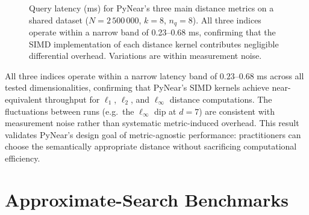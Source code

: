 \documentclass[11pt,a4paper]{article}
\begin{document}
\begin{figure}[h]
\centering
{}
\caption{Query latency (ms) for PyNear's three main distance metrics on a
  shared dataset ($N=2\,500\,000$, $k=8$, $n_q=8$).  All three indices
  operate within a narrow band of 0.23--0.68 ms, confirming that the SIMD
  implementation of each distance kernel contributes negligible differential
  overhead.  Variations are within measurement noise.}
\label{fig:internal}
\end{figure}

All three indices operate within a narrow latency band of
$0.23\text{--}0.68$ ms across all tested dimensionalities, confirming
that PyNear's SIMD kernels achieve near-equivalent throughput for $\ell_1$,
$\ell_2$, and $\ell_\infty$ distance computations.  The
fluctuations between runs (e.g.\ the $\ell_\infty$ dip at $d=7$) are
consistent with measurement noise rather than
systematic metric-induced overhead.  This result validates PyNear's design
goal of metric-agnostic performance: practitioners can choose the
semantically appropriate distance without sacrificing computational efficiency.

\section{Approximate-Search Benchmarks}
\label{sec:approx}
\end{document}
